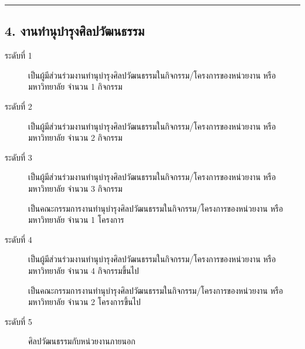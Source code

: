 \documentclass[a4paper,12pt,english]{sphinxmanual}
\begin{document}
\bigskip\hrule\bigskip



\subsection{4. งานทำนุบำรุงศิลปวัฒนธรรม}
\label{\detokenize{submission_part1:id18}}\begin{description}
\item[{ระดับที่ 1}] \leavevmode
เป็นผู้มีส่วนร่วมงานทำนุบำรุงศิลปวัฒนธรรมในกิจกรรม/โครงการของหน่วยงาน หรือมหาวิทยาลัย จำนวน 1 กิจกรรม

\item[{ระดับที่ 2}] \leavevmode
เป็นผู้มีส่วนร่วมงานทำนุบำรุงศิลปวัฒนธรรมในกิจกรรม/โครงการของหน่วยงาน หรือมหาวิทยาลัย จำนวน 2 กิจกรรม

\item[{ระดับที่ 3}] \leavevmode
เป็นผู้มีส่วนร่วมงานทำนุบำรุงศิลปวัฒนธรรมในกิจกรรม/โครงการของหน่วยงาน หรือมหาวิทยาลัย จำนวน 3 กิจกรรม

 เป็นคณะกรรมการงานทำนุบำรุงศิลปวัฒนธรรมในกิจกรรม/โครงการของหน่วยงาน หรือมหาวิทยาลัย จำนวน 1 โครงการ

\item[{ระดับที่ 4}] \leavevmode
เป็นผู้มีส่วนร่วมงานทำนุบำรุงศิลปวัฒนธรรมในกิจกรรม/โครงการของหน่วยงาน หรือมหาวิทยาลัย จำนวน 4 กิจกรรมขึ้นไป

 เป็นคณะกรรมการงานทำนุบำรุงศิลปวัฒนธรรมในกิจกรรม/โครงการของหน่วยงาน หรือมหาวิทยาลัย จำนวน 2 โครงการขึ้นไป

\item[{ระดับที่ 5}] \leavevmode
{\hyperref[\detokenize{glossary:term-11}]{}} ศิลปวัฒนธรรมกับหน่วยงานภายนอก

\end{description}
\end{document}
